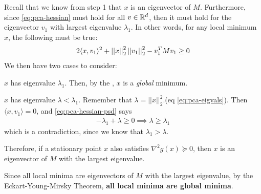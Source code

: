 \documentclass[11pt]{article}
\begin{document}
\begin{example}
\begin{compactenum}
\begin{compactenum}
			\item Recall that we know from step 1 that $x$ is an eigenvector of $M$. Furthermore, since \ref{eq:pca-hessian} must hold for all $v \in \mathbb{R}^d$, then it must hold for the eigenvector $v_1$ with largest eigenvalue $\lambda_1$. In other words, for any local minimum $x$, the following must be true:
			\begin{align}
				2 \langle x, v_1 \rangle^2 + \left|\left| x \right|\right|_{2}^2 \left|\left| v_1 \right|\right|_{2}^2 - v_1^T M v_1 \geq 0 \label{eq:pca-hessian-psd}
			\end{align}
			We then have two cases to consider:
			\begin{compactenum}
				\item $x$ has eigenvalue $\lambda_1$. Then, by the , $x$ is a \textit{global} minimum. 
				
				\item $x$ has eigenvalue $\lambda < \lambda_1$.  Remember that $\lambda = ||x||_2^2$.(eq \ref{eq:pca-eigvals}). Then $\langle x, v_1 \rangle = 0$, and \ref{eq:pca-hessian-psd} says
				\begin{align}
					- \lambda_1 + \lambda \geq 0 \implies \lambda \geq \lambda_1
				\end{align}
			  which is a contradiction, since we know that $\lambda_1 > \lambda$. 
			\end{compactenum}
		
			\item Therefore, if a stationary point $x$ also satisfies $\nabla^2 g(x) \succeq 0$, then $x$ is an eigenvector of $M$ with the largest eigenvalue. 
		\end{compactenum}
	
		\item Since all local minima are eigenvectors of $M$ with the largest eigenvalue, by the Eckart-Young-Mirsky Theorem, \textbf{all local minima are global minima}. 
	\end{compactenum}
\end{example}
\end{document}
